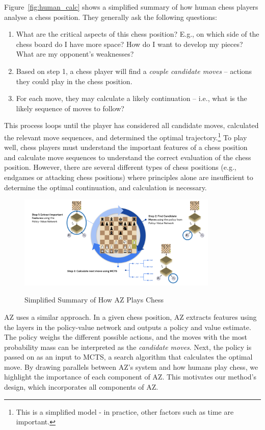 \documentclass{article}
\begin{document}
Figure~\ref{fig:human_calc} shows a simplified summary of how human chess players analyse a chess position. They generally ask the following questions:
\begin{enumerate}
    \item What are the critical aspects of this chess position? E.g., on which side of the chess board do I have more space? How do I want to develop my pieces? What are my opponent's weaknesses? 
    \item Based on step 1, a chess player will find a \textit{couple candidate moves} -- actions they could play in the chess position. 
    \item For each move, they may calculate a likely continuation -- i.e., what is the likely sequence of moves to follow? 
\end{enumerate}
This process loops until the player has considered all candidate moves, calculated the relevant move sequences, and determined the optimal trajectory.\footnote{This is a simplified model - in practice, other factors such as time are important.} To play well, chess players must understand the important features of a chess position and calculate move sequences to understand the correct evaluation of the chess position. 
However, there are several different types of chess positions (e.g., endgames or attacking chess positions) where principles alone are insufficient to determine the optimal continuation, and calculation is necessary.  

\begin{figure}[ht] 
\centering
\caption{Simplified Summary of How AZ Plays Chess}
\includegraphics[width=0.85\textwidth]{images/az_calc.png}
\label{fig:az_calc}
\end{figure}

AZ uses a similar approach. In a given chess position, AZ extracts features using the layers in the policy-value network and outputs a policy and value estimate. 
The policy weighs the different possible actions, and the moves with the most probability mass can be interpreted as the \textit{candidate moves}. 
Next, the policy is passed on as an input to MCTS, a search algorithm that calculates the optimal move. 
By drawing parallels between AZ's system and how humans play chess, we highlight the importance of each component of AZ. This motivates our method's design, which incorporates all components of AZ.
\end{document}
